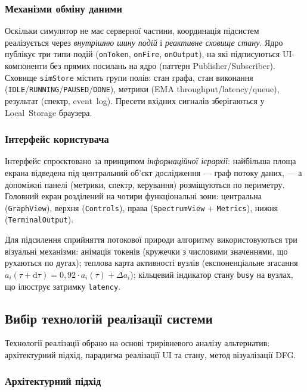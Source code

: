 \documentclass[14pt,a4paper]{extarticle}
\begin{document}
\subsubsection*{Механізми обміну даними}

Оскільки симулятор не має серверної частини, координація підсистем
реалізується через \emph{внутрішню шину подій} і \emph{реактивне
сховище стану}. Ядро публікує три типи подій (\texttt{onToken},
\texttt{onFire}, \texttt{onOutput}), на які підписуються UI-компоненти
без прямих посилань на ядро (паттерн Publisher/Subscriber). Сховище
\texttt{simStore} містить групи полів: стан графа, стан виконання
(\texttt{IDLE}/\texttt{RUNNING}/\texttt{PAUSED}/\texttt{DONE}),
метрики (EMA throughput/latency/queue), результат (спектр,
event~log). Пресети вхідних сигналів зберігаються у Local~Storage
браузера.

\subsubsection*{Інтерфейс користувача}

Інтерфейс спроєктовано за принципом \emph{інформаційної ієрархії}:
найбільша площа екрана відведена під центральний об'єкт дослідження
--- граф потоку даних, --- а допоміжні панелі (метрики, спектр,
керування) розміщуються по периметру. Головний екран розділений на
чотири функціональні зони: центральна (\texttt{GraphView}), верхня
(\texttt{Controls}), права (\texttt{SpectrumView} + \texttt{Metrics}),
нижня (\texttt{TerminalOutput}).

Для підсилення сприйняття потокової природи алгоритму використовуються
три візуальні механізми: анімація токенів (кружечки з числовими
значеннями, що рухаються по дугах); теплова карта активності вузлів
(експоненціальне згасання $a_i(\tau + \mathrm{d}\tau) = 0{,}92 \cdot
a_i(\tau) + \Delta a_i$); кільцевий індикатор стану \texttt{busy} на
вузлах, що ілюструє затримку \texttt{latency}.

\subsection{Вибір технологій реалізації системи}

Технології реалізації обрано на основі трирівневого аналізу
альтернатив: архітектурний підхід, парадигма реалізації UI та стану,
метод візуалізації DFG.

\subsubsection*{Архітектурний підхід}
\end{document}
